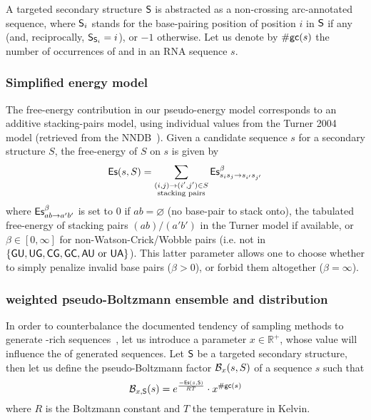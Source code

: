 A targeted secondary structure $\text{\sf S}$ is abstracted as a non-crossing arc-annotated sequence,  where 
$\text{\sf S}_i$ stands for the base-pairing position of position $i$ in $\text{\sf S}$ if any (and, reciprocally, $\text{\sf S}_{\text{\sf S}_i}=i$), or $-1$ otherwise. 
Let us denote by ${\#\text{{\sf gc}}}(s)$ the number of occurrences of \Gb and \Cb in an RNA sequence $s$.

\subsubsection{Simplified energy model}
The free-energy contribution in our pseudo-energy model corresponds to an additive stacking-pairs model, using individual values from the Turner 2004 model (retrieved from the NNDB~\cite{Turner2010}). Given a candidate sequence $s$ for a secondary structure $S$, the free-energy of $S$ on $s$ is given by
\begin{align*}
  \text{{\sf Es}}(s,S) = \sum_{\substack{(i,j)\to (i',j')\in S\\ \text{stacking pairs}}}\text{{\sf Es}}^{\beta}_{s_is_j\to s_{i'}s_{j'}} 
\end{align*}
where $\text{{\sf Es}}^{\beta}_{ab\to a'b'}$ is set to $0$ if $ab=\varnothing$ (no base-pair to stack onto), the tabulated free-energy of stacking pairs $(ab)/(a'b')$ in the Turner model if available, or $\beta\in[0,\infty]$ for non-Watson-Crick/Wobble pairs (i.e. not in $\{{\sf{G}}{\sf{U}},{\sf{U}}{\sf{G}},{\sf{C}}{\sf{G}},{\sf{G}}{\sf{C}}, {\sf{A}}{\sf{U}}\text{ or }{\sf{U}}{\sf{A}}\}$). This latter parameter allows one to choose whether to simply penalize invalid base pairs ($\beta>0$), or forbid them altogether ($\beta = \infty$).

\subsubsection{\GCContent weighted pseudo-Boltzmann ensemble and distribution}

In order to counterbalance the documented tendency of sampling methods to generate \Gb\Cb-rich sequences~\cite{Levin:2012kx}, let us introduce a parameter $x\in\mathbb{R}^+$, whose value will influence the \GCContent of generated sequences. Let $\text{\sf S}$ be a targeted secondary structure, then let us define the pseudo-Boltzmann factor $\mathcal{B}_{x}(s,S)$ of a sequence $s$ such that
\begin{equation}
\mathcal{B}_{x, \text{\sf S}}(s) = e^{\frac{-\text{{\sf Es}}(s,\text{\sf S})}{RT}}\cdot x^{{\#\text{{\sf gc}}}(s)}
\label{def:genBoltz}
\end{equation}
where $R$ is the Boltzmann constant and $T$ the temperature in Kelvin.

